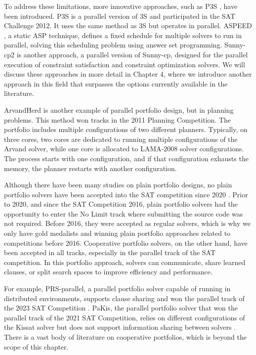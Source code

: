 To address these limitations, more innovative approaches, such as P3S \cite{p3s}, have been introduced. P3S is a parallel version of 3S \cite{3s} and participated in the SAT Challenge 2012. It uses the same method as 3S but operates in parallel. ASPEED \cite{aspeed}, a static ASP technique, defines a fixed schedule for multiple solvers to run in parallel, solving this scheduling problem using answer set programming. Sunny-cp2 \cite{sunnycp2} is another approach, a parallel version of Sunny-cp, designed for the parallel execution of constraint satisfaction and constraint optimization solvers. We will discuss these approaches in more detail in Chapter 4, where we introduce another approach in this field that surpasses the options currently available in the literature.

ArvandHerd \cite{10.5555/3007337.3007474} is another example of parallel portfolio design, but in planning problems. This method won tracks in the 2011 Planning Competition. The portfolio includes multiple configurations of two different planners. Typically, on three cores, two cores are dedicated to running multiple configurations of the Arvand solver, while one core is allocated to LAMA-2008 solver configurations. The process starts with one configuration, and if that configuration exhausts the memory, the planner restarts with another configuration.

Although there have been many studies on plain portfolio designs, no plain portfolio solvers have been accepted into the SAT competition since 2020 \cite{FROLEYKS2021103572}. Prior to 2020, and since the SAT Competition 2016, plain portfolio solvers had the opportunity to enter the No Limit track where submitting the source code was not required. Before 2016, they were accepted as regular solvers, which is why we only have gold medalists and winning plain portfolio approaches related to competitions before 2016. Cooperative portfolio solvers, on the other hand, have been accepted in all tracks, especially in the parallel track of the SAT competition. In this portfolio approach, solvers can communicate, share learned clauses, or split search spaces to improve efficiency and performance.

For example, PRS-parallel, a parallel portfolio solver capable of running in distributed environments, supports clause sharing and won the parallel track of the 2023 SAT Competition \cite{sat2023}. PaKis, the parallel portfolio solver that won the parallel track of the 2021 SAT Competition, relies on different configurations of the Kissat solver but does not support information sharing between solvers \cite{sat2021}. There is a vast body of literature on cooperative portfolios, which is beyond the scope of this chapter. 

